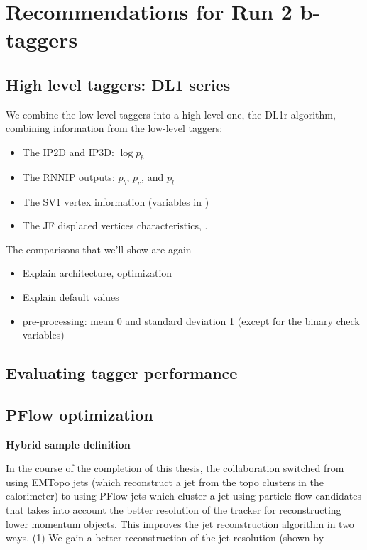 \section{Recommendations for Run 2 b-taggers}

\subsection{High level taggers: DL1 series}

We combine the low level taggers into a high-level one, the DL1r algorithm, combining information from the low-level taggers:
\begin{itemize}%
	\item The IP2D and IP3D: $\log p_b$
	\item The RNNIP outputs: $p_b$, $p_c$, and $p_l$
	\item The SV1 vertex information (variables in \Tab{\ref{tab:sv1-inputs}})
	\item The JF displaced vertices characteristics, \Tab{\ref{tab:sv1-inputs}}.
\end{itemize} 


The comparisons that we'll show are again

\begin{itemize}
	\item Explain architecture, optimization
	\item Explain default values
	\item pre-processing:  mean 0 and standard deviation 1 (except for the binary check variables)
\end{itemize} 

\subsection{Evaluating tagger performance}


\subsection{PFlow optimization}

\textbf{Hybrid sample definition}

In the course of the completion of this thesis, the collaboration switched from using EMTopo jets (which reconstruct a jet from the topo clusters in the calorimeter) to  using PFlow jets which cluster a jet using particle flow candidates that takes into account the better resolution of the tracker for reconstructing lower momentum objects. This improves the jet reconstruction algorithm in two ways. (1) We gain a better reconstruction of the jet \pt resolution (shown by 

